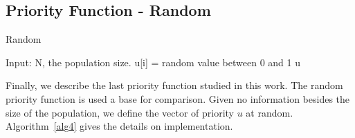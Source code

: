 \subsection{Priority Function - Random}

\begin{algorithm}[t]
	\caption{Random}\label{alg4}
	\begin{algorithmic}[1]
		
		\State Input:  N, the population size.
		\State u[i] = random value between 0 and 1
		\EndFor
		\Return u
	\end{algorithmic}
\end{algorithm}

Finally, we describe the last priority function studied in this work. The random priority function is used a base for comparison. Given no information besides the size of the population, we define the vector of priority $u$ at random. Algorithm~\ref{alg4} gives the details on implementation. 
%
%
%
%
% 
%




